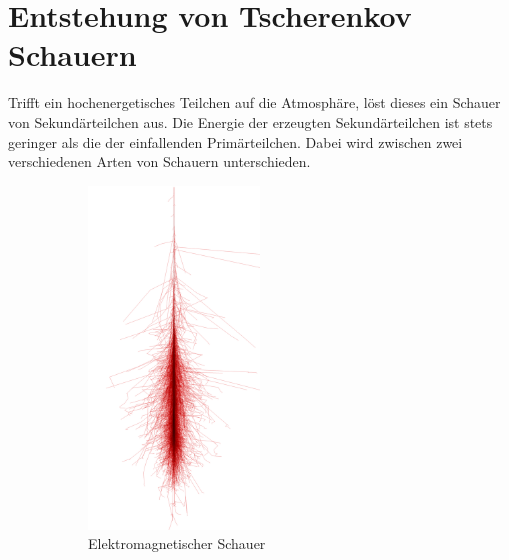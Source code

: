 \chapter{Entstehung von Tscherenkov Schauern}
\label{sec:cherenkov}
Trifft ein hochenergetisches Teilchen auf die Atmosphäre, löst dieses ein Schauer von Sekundärteilchen aus. 
Die Energie der erzeugten Sekundärteilchen ist stets geringer als die der einfallenden Primärteilchen. 
Dabei wird zwischen zwei verschiedenen Arten von Schauern unterschieden. 
\begin{figure}[H]
  \centering
  \begin{subfigure}[t]{0.49\textwidth}
  	\centering
	\includegraphics[width=0.5\textwidth]{images/photon_100GeV.png}
	\caption{Elektromagnetischer Schauer}
  \end{subfigure}
  \begin{subfigure}[t]{0.49\textwidth}
  	\centering

\end{subfigure}
\end{figure}
